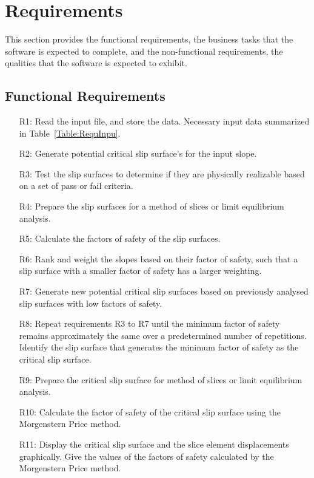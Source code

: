 \documentclass[12pt]{article}
\begin{document}
\section{Requirements}
\label{Sec:Requ}
This section provides the functional requirements, the business tasks that the software is expected to complete, and the non-functional requirements, the qualities that the software is expected to exhibit.
\subsection{Functional Requirements}
\label{Sec:FuncRequ}
\begin{itemize}
\item[R1:]Read the input file, and store the data. Necessary input data summarized in Table~\ref{Table:RequInpu}.
\item[R2:]Generate potential critical slip surface's for the input slope.
\item[R3:]Test the slip surfaces to determine if they are physically realizable based on a set of pass or fail criteria.
\item[R4:]Prepare the slip surfaces for a method of slices or limit equilibrium analysis.
\item[R5:]Calculate the factors of safety of the slip surfaces.
\item[R6:]Rank and weight the slopes based on their factor of safety, such that a slip surface with a smaller factor of safety has a larger weighting.
\item[R7:]Generate new potential critical slip surfaces based on previously analysed slip surfaces with low factors of safety.
\item[R8:]Repeat requirements R3 to R7 until the minimum factor of safety remains approximately the same over a predetermined number of repetitions. Identify the slip surface that generates the minimum factor of safety as the critical slip surface.
\item[R9:]Prepare the critical slip surface for method of slices or limit equilibrium analysis.
\item[R10:]Calculate the factor of safety of the critical slip surface using the Morgenstern Price method.
\item[R11:]Display the critical slip surface and the slice element displacements graphically. Give the values of the factors of safety calculated by the Morgenstern Price method.
\end{itemize}
\end{document}
